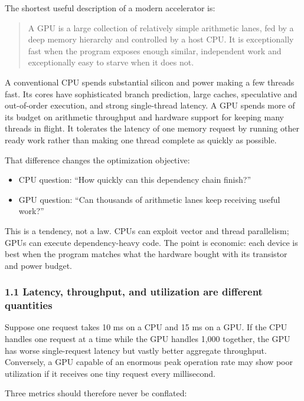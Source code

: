 \documentclass[
  10pt,
  letterpaper,
]{article}
\providecommand{\tightlist}{%
  \setlength{\itemsep}{0pt}\setlength{\parskip}{0pt}}
\begin{document}
The shortest useful description of a modern accelerator is:

\begin{quote}
A GPU is a large collection of relatively simple arithmetic lanes, fed
by a deep memory hierarchy and controlled by a host CPU. It is
exceptionally fast when the program exposes enough similar, independent
work and exceptionally easy to starve when it does not.
\end{quote}

A conventional CPU spends substantial silicon and power making a few
threads fast. Its cores have sophisticated branch prediction, large
caches, speculative and out-of-order execution, and strong single-thread
latency. A GPU spends more of its budget on arithmetic throughput and
hardware support for keeping many threads in flight. It tolerates the
latency of one memory request by running other ready work rather than
making one thread complete as quickly as possible.

That difference changes the optimization objective:

\begin{itemize}
\tightlist
\item
  CPU question: ``How quickly can this dependency chain finish?''
\item
  GPU question: ``Can thousands of arithmetic lanes keep receiving
  useful work?''
\end{itemize}

This is a tendency, not a law. CPUs can exploit vector and thread
parallelism; GPUs can execute dependency-heavy code. The point is
economic: each device is best when the program matches what the hardware
bought with its transistor and power budget.

\subsubsection{1.1 Latency, throughput, and utilization are different
quantities}\label{11-latency-throughput-and-utilization-are-different-quantities}

Suppose one request takes 10 ms on a CPU and 15 ms on a GPU. If the CPU
handles one request at a time while the GPU handles 1,000 together, the
GPU has worse single-request latency but vastly better aggregate
throughput. Conversely, a GPU capable of an enormous peak operation rate
may show poor utilization if it receives one tiny request every
millisecond.

Three metrics should therefore never be conflated:
\end{document}
